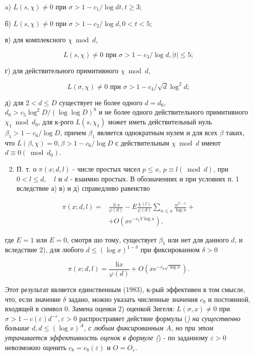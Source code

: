 \documentclass[10pt]{article}
\begin{document}
a) $L(s, \chi) \neq 0$ при $\sigma>1-c_{1} / \log d t, t \geqslant 3$;

б) $L(s, \chi) \neq 0$ при $\sigma>1-c_{2} / \log d, 0<t<5$;

в) для комплексного $\chi \bmod d$,

\[
L(s, \chi) \neq 0 \text { при } \sigma>1-c_{3} / \log d,|t| \leqslant 5 ;
\]

г) для действительного примитивного $\chi \bmod d$,

\[
L(\sigma, \chi) \neq 0 \text { при } \sigma>1-c_{4} / \sqrt{d} \log ^{2} d ;
\]

д) для $2<d \leqslant D$ существует не более одного $d=d_{0}$, $d_{0}>c_{5} \log ^{2} D /(\log \log D)^{8}$ и не более одного действительного примитивного $\chi_{1} \bmod d_{0}$, для к-рого $L\left(s, \chi_{1}\right)$ может иметь действительный нуль $\beta_{1}>1-c_{6} / \log D$, причем $\beta_{1}$ является однократным нулем и для всех $\beta$ таких, что $L(\beta, \chi)=0, \beta>1-c_{6} / \log D$ с действительным $\chi \bmod d$ имеют $d \equiv 0\left(\bmod d_{0}\right)$.

\begin{enumerate}
  \setcounter{enumi}{1}
  \item П. т. о $\pi(x ; d, l)$ - числе простых чисел $p \leqslant x$, $p \equiv l(\bmod d)$, при $0<l \leqslant d, \quad l$ и $d$ - взаимно простых. В обозначениях и при условиях п. 1 вследствие а) в) и д) справедливо равенство
\end{enumerate}

\[
\begin{aligned}
\pi(x ; d, l)= & \frac{\operatorname{li} x}{\varphi(d)}-E \frac{\chi(l)}{\varphi(d)} \sum_{n \leqslant x} \frac{n^{\beta,-1}}{\log n}+ \\
& +O\left(x e^{-c_{7} V \log x}\right),
\end{aligned}
\]

где $E=1$ или $E=0$, смотря шо тому, существует $\beta_{1}$ или нет для данного $d$, и вследствие 2), для любого $d \leqslant(\log x)^{1-\delta}$ при фиксированном $\delta>0$

\[
\pi(x ; d, l)=\frac{\mathrm{li} x}{\varphi(d)}+O\left(x e^{-c_{8} \sqrt{\log x}}\right) .
\]

Этот результат является единственным (1983), к-рый эффективен в том смысле, что, если значение $\delta$ задано, можно указать численные значения $c_{8}$ и постоянной, входящей в символ 0. Замена оценки 2) оценкой Зигеля: $L(\sigma, x) \neq 0$ при $\sigma>1-c(\varepsilon) d^{-\varepsilon}, \varepsilon>0$ распростравяет действие формулы (\textit{) на существенно большие $d, d \leqslant(\log x)^{A}$, с любым фиксированным $A$, но при этом утрачивается эффективность оценок в формуле (}) - по заданному $\varepsilon>0$ невозможно оценить $c_{8}=c_{8}(\varepsilon)$ и $O=O_{\varepsilon}$.
\end{document}

